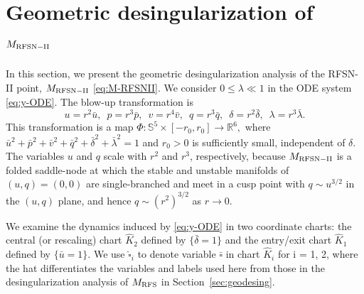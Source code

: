 \documentclass[11pt]{article}
\numberwithin{equation}{section}
\begin{document}
\section{Geometric desingularization of \texorpdfstring{$M_{\rm RFSN-II}$ }{Lg}}\label{sec:RFSNII-desing}

In this section, we present the geometric desingularization analysis of the RFSN-II point, $M_{\rm RFSN-II}$ \eqref{eq:M-RFSNII}.
We consider $0 \le \lambda\ll 1$ in the ODE system \eqref{eq:y-ODE}.
The blow-up transformation is
\begin{equation}\label{eq:blowup-RFSNII}
u = r^2 \bar{u}, \, \, \,
p = r^3 \bar{p}, \, \, \,
v = r^4 \bar{v}, \, \, \,
q= r^3 \bar{q}, \, \, \,
\delta = r^2 \bar{\delta}, \, \, \, 
\lambda=r^3 \bar{\lambda}.
\end{equation}
This transformation is a map
$\Phi: \mathbb{S}^5 \times [-r_0,r_0]  \to \mathbb{R}^6,$
where $\bar{u}^2 + \bar{p}^2 + \bar{v}^2 + \bar{q}^2 + \bar{\delta}^2 + \bar{\lambda}^2 = 1$ and $r_0>0$ is sufficiently small, independent of $\delta$.
The variables $u$ and $q$ scale with $r^2$ and $r^3$, respectively, because $M_{\rm RFSN-II}$ is a folded saddle-node at which the stable and unstable manifolds of $(u,q)=(0,0)$ are single-branched and meet in a cusp point with $q \sim u^{3/2}$ in the $(u,q)$ plane, and hence $q \sim (r^2)^{3/2}$ as $r \to 0$.  

We examine the dynamics induced by \eqref{eq:y-ODE} in two coordinate charts:
the central (or rescaling) chart $\hat{K}_2$ defined by $\{\bar{\delta}=1\}$
and the entry/exit chart $\hat{K}_1$ defined by $\{ \bar{u}=1 \}$.
We use $\hat{\square}_i$ to denote variable $\bar{\square}$ in chart $\hat K_i$ for i = 1, 2, where the hat differentiates the variables and labels used here from those in the desingularization analysis of $M_{\rm RFS}$ in Section~\ref{sec:geodesing}.
\end{document}

